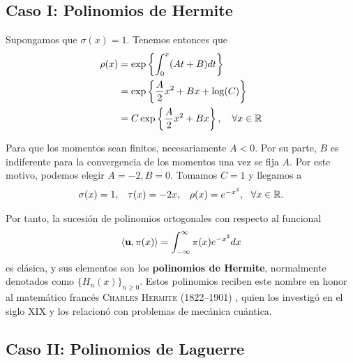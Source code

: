\subsection{Caso I: Polinomios de Hermite}
\label{subsection:Hermite}

Supongamos que $\sigma(x)=1$. Tenemos entonces que
\begin{equation*}
    \begin{split}
        \rho(x) &= \exp\left\{ \int_0^x (At+B)dt \right\}\\
        &= \exp\left\{ \dfrac{A}{2}x^2+Bx+\log(C) \right\} \\
        &= C \exp\left\{ \dfrac{A}{2}x^2+Bx \right\}, \ \ \ \forall x\in\mathbb{R}
    \end{split}
\end{equation*}

Para que los momentos sean finitos, necesariamente $A<0$. Por su parte, $B$ es indiferente para la convergencia de los momentos una vez se fija $A$. Por este motivo, podemos elegir $A=-2, B=0$. Tomamos $C=1$ y llegamos a 
\begin{equation}
    \label{eq:parametros-hermite}
    \begin{array}{ccc}
        \sigma(x)=1, & \tau(x)=-2x, & \rho(x) = e^{-x^2}, \ \ \forall x \in \R.
    \end{array}
\end{equation}

Por tanto, la sucesión de polinomios ortogonales con respecto al funcional
\begin{equation}
    \label{eq:func-hermite}
    \left\langle \mathbf{u} , \pi(x) \right\rangle = \int_{-\infty}^\infty \pi(x)e^{-x^2}dx
\end{equation}
es clásica, y sus elementos son los \textbf{polinomios de Hermite}, normalmente denotados como $\{H_n(x)\}_{n\geq 0}$. Estos polinomios reciben este nombre en honor al matemático francés \textsc{Charles Hermite} (1822--1901) , quien los investigó en el siglo XIX y los relacionó con problemas de mecánica cuántica.

\subsection{Caso II: Polinomios de Laguerre}

